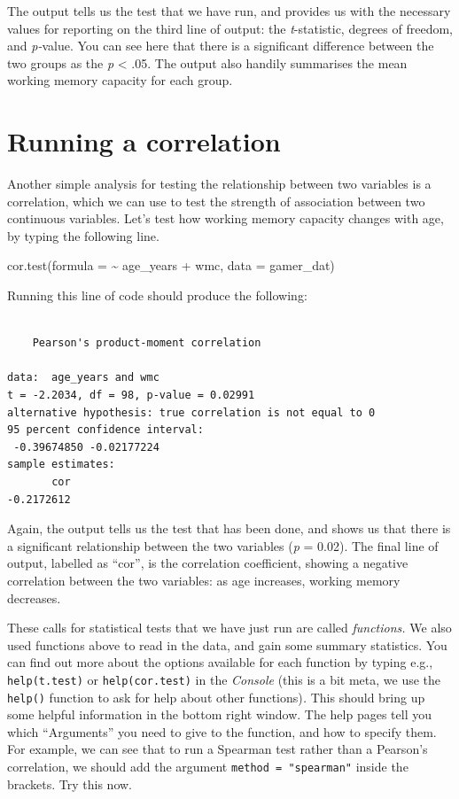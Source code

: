 \documentclass[
  a4paper,
  DIV=11,
  numbers=noendperiod]{scrreprt}
\newenvironment{Shaded}{\begin{snugshade}}{\end{snugshade}}
\newcommand{\AttributeTok}[1]{\textcolor[rgb]{0.40,0.45,0.13}{#1}}
\newcommand{\FunctionTok}[1]{\textcolor[rgb]{0.28,0.35,0.67}{#1}}
\newcommand{\NormalTok}[1]{\textcolor[rgb]{0.00,0.23,0.31}{#1}}
\newcommand{\SpecialCharTok}[1]{\textcolor[rgb]{0.37,0.37,0.37}{#1}}
\begin{document}
The output tells us the test that we have run, and provides us with the
necessary values for reporting on the third line of output: the
\emph{t}-statistic, degrees of freedom, and \emph{p-}value. You can see
here that there is a significant difference between the two groups as
the \emph{p} \textless{} .05. The output also handily summarises the
mean working memory capacity for each group.

\section{Running a correlation}\label{running-a-correlation}

Another simple analysis for testing the relationship between two
variables is a correlation, which we can use to test the strength of
association between two continuous variables. Let's test how working
memory capacity changes with age, by typing the following line.

\begin{Shaded}
\begin{Highlighting}[]
\FunctionTok{cor.test}\NormalTok{(}\AttributeTok{formula =} \SpecialCharTok{\textasciitilde{}}\NormalTok{ age\_years }\SpecialCharTok{+}\NormalTok{ wmc, }\AttributeTok{data =}\NormalTok{ gamer\_dat)}
\end{Highlighting}
\end{Shaded}

Running this line of code should produce the following:

\begin{verbatim}

    Pearson's product-moment correlation

data:  age_years and wmc
t = -2.2034, df = 98, p-value = 0.02991
alternative hypothesis: true correlation is not equal to 0
95 percent confidence interval:
 -0.39674850 -0.02177224
sample estimates:
       cor 
-0.2172612 
\end{verbatim}

Again, the output tells us the test that has been done, and shows us
that there is a significant relationship between the two variables
(\emph{p} = 0.02). The final line of output, labelled as ``cor'', is the
correlation coefficient, showing a negative correlation between the two
variables: as age increases, working memory decreases.

These calls for statistical tests that we have just run are called
\emph{functions.} We also used functions above to read in the data, and
gain some summary statistics. You can find out more about the options
available for each function by typing e.g., \texttt{help(t.test)} or
\texttt{help(cor.test)} in the \emph{Console} (this is a bit meta, we
use the \texttt{help()} function to ask for help about other
functions)\emph{.} This should bring up some helpful information in the
bottom right window. The help pages tell you which ``Arguments'' you
need to give to the function, and how to specify them. For example, we
can see that to run a Spearman test rather than a Pearson's correlation,
we should add the argument \texttt{method\ =\ "spearman"} inside the
brackets. Try this now.
\end{document}
